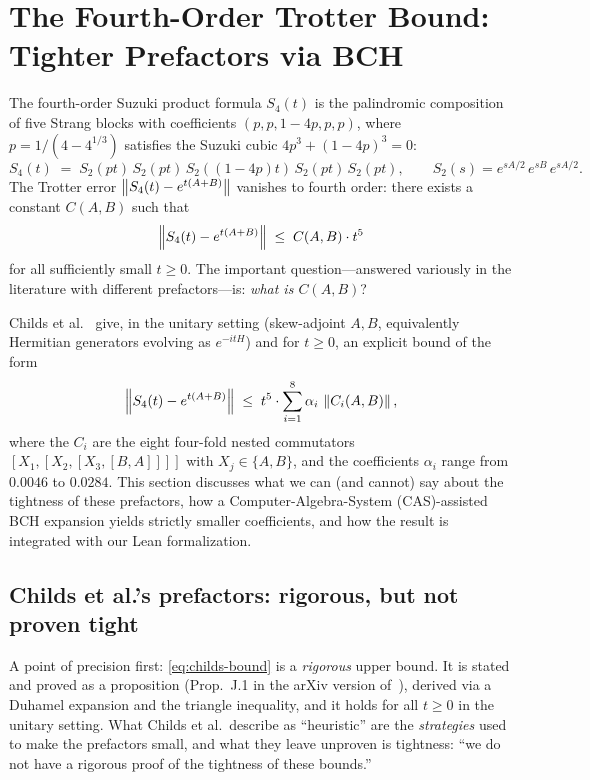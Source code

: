 \section{The Fourth-Order Trotter Bound: Tighter Prefactors via BCH}
\label{sec:suzuki4}

The fourth-order Suzuki product formula $S_4(t)$ is the palindromic composition
of five Strang blocks with coefficients $(p, p, 1{-}4p, p, p)$, where
$p = 1/(4-4^{1/3})$ satisfies the Suzuki cubic $4p^3 + (1-4p)^3 = 0$:
\begin{equation}
  S_4(t)
    \;=\; S_2(pt)\,S_2(pt)\,S_2((1{-}4p)t)\,S_2(pt)\,S_2(pt),
  \qquad
  S_2(s) = e^{sA/2}\, e^{sB}\, e^{sA/2}.
\end{equation}
The Trotter error $\left\|S_4(t) - e^{t(A+B)}\right\|$ vanishes to fourth order:
there exists a constant $C(A,B)$ such that
\begin{equation}
  \left\|S_4(t) - e^{t(A+B)}\right\| \;\le\; C(A,B)\cdot t^5
\end{equation}
for all sufficiently small $t \ge 0$. The important question---answered
variously in the
literature with different prefactors---is: \emph{what is $C(A,B)$}?

Childs et al.~\cite{childsTheoryTrotterError2021} give, in the unitary
setting (skew-adjoint $A, B$, equivalently Hermitian generators evolving as
$e^{-itH}$) and for $t \ge 0$, an explicit bound of the
form
\begin{equation}\label{eq:childs-bound}
  \left\|S_4(t) - e^{t(A+B)}\right\| \;\le\; t^5 \cdot \sum_{i=1}^{8} \alpha_i\, \left\|C_i(A,B)\right\|,
\end{equation}
where the $C_i$ are the eight four-fold nested commutators
$[X_1,[X_2,[X_3,[B,A]]]]$ with $X_j \in \{A, B\}$, and the coefficients $\alpha_i$
range from $0.0046$ to $0.0284$. This section discusses what we can (and cannot)
say about the tightness of these prefactors, how a Computer-Algebra-System
(CAS)-assisted BCH expansion yields strictly smaller coefficients, and how the
result is integrated with our Lean formalization.

\subsection{Childs et al.'s prefactors: rigorous, but not proven tight}
\label{sec:childs-heuristic}

A point of precision first: \cref{eq:childs-bound} is a \emph{rigorous}
upper bound. It is stated and proved as a proposition (Prop.~J.1 in the
arXiv version of~\cite{childsTheoryTrotterError2021}), derived via a
Duhamel expansion and the triangle inequality, and it holds for all
$t \ge 0$ in the unitary setting. What Childs et al.\ describe as
``heuristic'' are the \emph{strategies} used to make the prefactors small,
and what they leave unproven is tightness: ``we do not have a rigorous
proof of the tightness of these bounds.''

